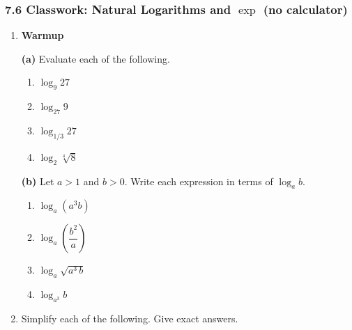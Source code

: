 \documentclass[12pt, twoside]{article}
\begin{document}
\subsubsection*{7.6 Classwork: Natural Logarithms and $\exp$ (no calculator)}

\begin{enumerate}[itemsep=0.4cm]

\item[1.] \textbf{Warmup}

\textbf{(a)} Evaluate each of the following.

\begin{enumerate}[label=(\roman*), itemsep=1cm]
  \item $\log_9 27$
  \vspace{0.6cm}

  \item $\log_{27} 9$
  \vspace{0.6cm}

  \item $\log_{1/3} 27$
  \vspace{0.6cm}

  \item $\log_2 \sqrt[4]{8}$
  \vspace{1cm}
\end{enumerate}

\textbf{(b)} Let $a > 1$ and $b > 0$. Write each expression in terms of
$\log_a b$.

\begin{enumerate}[label=(\roman*), itemsep=1cm]
  \item $\log_a (a^3 b)$
  \vspace{0.6cm}

  \item $\log_a \!\left(\dfrac{b^2}{a}\right)$
  \vspace{0.6cm}

  \item $\log_a \sqrt{a^3\, b}$
  \vspace{0.6cm}

  \item $\log_{a^3} b$
  \vspace{0.6cm}
\end{enumerate}

\newpage

\item[2.] Simplify each of the following. Give exact answers.


\end{enumerate}
\end{document}
